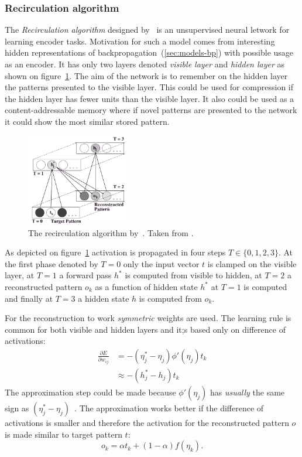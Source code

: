 \subsubsection{Recirculation algorithm}
\label{sec:models-recirc} 

The \emph{Recirculation algorithm} designed by~\citet{hinton1988learning} is an unsupervised neural letwork for learning encoder tasks. Motivation for such a model comes from interesting hidden representations of backpropagation~(\ref{sec:models-bp}) with possible usage as an encoder. It has only two layers denoted \emph{visible layer} and \emph{hidden layer} as shown on figure~\ref{fig:models-recirc}. The aim of the network is to remember on the hidden layer the patterns presented to the visible layer. This could be used for compression if the hidden layer has fewer units than the visible layer. It also could be used as a content-addressable memory where if novel patterns are presented to the network it could show the most similar stored pattern. 

\begin{figure}[H]
  \centering
\includegraphics[width=0.4\textwidth]{img/recirculation.png}
  \caption{The recirculation algorithm by~\citet{hinton1988learning}. Taken from \citep{o1996bio}.}
  \label{fig:models-recirc}
\end{figure}

As depicted on figure~\ref{fig:models-recirc} activation is propagated in four steps $T \in \{0,1,2,3\}$. At the first phase denoted by $T=0$ only the input vector $t$ is clamped on the visible layer, at $T=1$ a forward pass $h^{*}$ is computed from visible to hidden, at $T=2$ a reconstructed pattern $o_k$ as a function of hidden state $h^{*}$ at $T=1$ is computed and finally at $T=3$ a hidden state $h$ is computed from $o_k$.

For the reconstruction to work \emph{symmetric} weights are used. The learning rule is common for both visible and hidden layers and it;s based only on difference of activations: 
\begin{align}
\frac{\partial E}{\partial w_{ij}} &= -(\eta^{*}_j - \eta_j) \phi'(\eta_j) t_k \nonumber \\
&\approx -(h^{*}_j - h_j)t_k \nonumber 
\end{align} 
The approximation step could be made because $\phi'(\eta_j)$ has \emph{usually} the same sign as $(\eta^{*}_j - \eta_j) $~\citep{hinton1988learning, o1996bio}. The approximation works better if the difference of activations is smaller and therefore the activation for the reconstructed pattern $o$  is made similar to target pattern $t$: 
\begin{equation}
o_k = \alpha t_k + (1-\alpha)f(\eta_k). 
\end{equation} 

